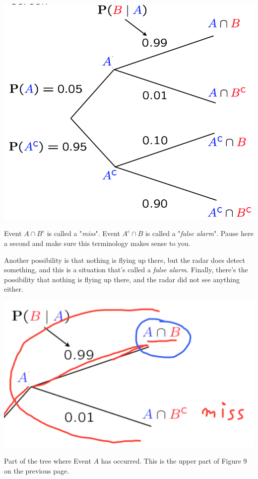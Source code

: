 \documentclass{tufte-handout}
\begin{document}
\begin{marginfigure}
  \includegraphics{AirplaneFullTree}
  \caption{Event $A \cap B^c$ is called a "\textit{miss}". Event $A^c \cap B$ is called a "\textit{false alarm}". Pause here a second and make sure this terminology makes sense to you.}
\end{marginfigure}



Another possibility is that nothing is flying up there, but the radar does detect something, and this is a
situation that's called a \textit{false alarm}. Finally, there's the possibility that nothing is flying up there, and the
radar did not see anything either.

\pagebreak
\begin{marginfigure}
  \includegraphics{AirplaneTreePart1}
  \caption{Part of the tree where Event $A$ has occurred. This is the upper part of Figure 9 on the previous page.}
\end{marginfigure}
\end{document}

